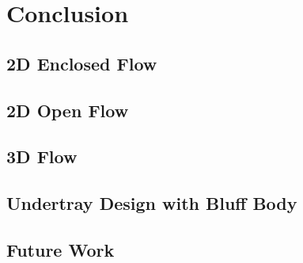 \section{Conclusion}
\justifying
\noindent
\subsection*{2D Enclosed Flow}

\subsection*{2D Open Flow}

\subsection*{3D Flow}

\subsection*{Undertray Design with Bluff Body}


\subsection{Future Work}